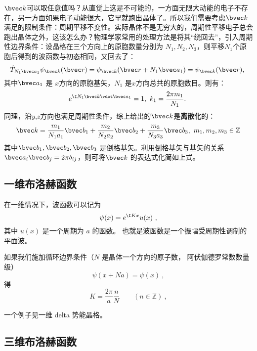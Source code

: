 $\bvec k$可以取任意值吗？从直觉上这是不可能的，一方面无限大动能的电子不存在，另一方面如果电子动能很大，它早就跑出晶体了。所以我们需要考虑$\bvec k$ 满足的限制条件：周期平移不变性。实际晶体不是无穷大的，周期性平移电子总会跑出晶体之外，这该怎么办？物理学家常用的处理方法是将其“绕回去”，引入周期性边界条件：设晶格在三个方向上的原胞数量分别为 $N_1,N_2,N_3$，则平移$N_1$个原胞后得到的波函数与初态相同，又回去了：
\begin{equation}
\hat T _{N_1 \bvec a_1}\psi_{\bvec k}(\bvec r)=\psi_{\bvec k}(\bvec r+N_1 \bvec a_1) = \psi_{\bvec k}(\bvec r),~
\end{equation}
其中$\bvec a_1$ 是 $x$方向的原胞基矢，$N_1$ 是$x$方向总共的原胞数目。则有：
\begin{equation}
e^{\I N_1 \bvec k \vdot  \bvec a_1} = 1,~ k_1 =\frac{2\pi m_1}{N_1}.~
\end{equation}
同理，沿$y$,$z$方向也满足周期性条件，综上给出的$\bvec k$是\textbf{离散化}的：
\begin{equation}
\bvec k = \dfrac{m_1}{N_1 a_1} \bvec b_1 + \dfrac{m_2}{N_2 a_2} \bvec b_2 + \dfrac{m_3}{N_3 a_3} \bvec b_3,~ m_1,m_2,m_3 \in \mathbb{Z}
\end{equation}
其中$\bvec b_1, \bvec b_2,\bvec b_3$ 是倒格基矢。利用倒格基矢与基矢的关系$\bvec a_i \bvec b_j = 2\pi \delta_{ij}$，则可将$\bvec k$ 的表达式化简如上式。

\subsection{一维布洛赫函数}
在一维情况下，波函数可以记为
\begin{equation}
\psi(x) = e^{\I K x} u(x)~,
\end{equation}
其中 $u(x)$ 是一个周期为 $a$ 的函数。 也就是波函数是一个振幅受周期性调制的平面波。

如果我们施加循环边界条件（$N$ 是晶体一个方向的原子数， 阿伏伽德罗常数数量级）
\begin{equation}
\psi(x+Na) = \psi(x)~,
\end{equation}
得
\begin{equation}
K = \frac{2\pi}{a} \frac{n}{N} \qquad (n \in \mathbb Z)~,
\end{equation}

一个例子见一维 delta 势能晶格。

\subsection{三维布洛赫函数}

